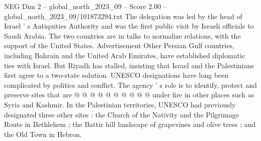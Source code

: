 \begin{textsample}{NEG Dim 2 – global\_north\_2023\_09 – Score 2.00 – global\_north\_2023\_09/101873294.txt}
The delegation was led by the head of Israel ' s Antiquities Authority and was the first public visit by Israeli officials to Saudi Arabia.
The two countries are in talks to normalize relations, with the support of the United States.
Advertisement Other Persian Gulf countries, including Bahrain and the United Arab Emirates, have established diplomatic ties with Israel.
But Riyadh has stalled, insisting that Israel and the Palestinians first agree to a two-state solution.
UNESCO designations have long been complicated by politics and conflict.
The agency ' s role is to identify, protect and preserve sites that are @ @ @ @ @ @ @ @ @ @ under fire in other places such as Syria and Kashmir.
In the Palestinian territories, UNESCO had previously designated three other sites : the Church of the Nativity and the Pilgrimage Route in Bethlehem ; the Battir hill landscape of grapevines and olive trees ; and the Old Town in Hebron.

\end{textsample}

